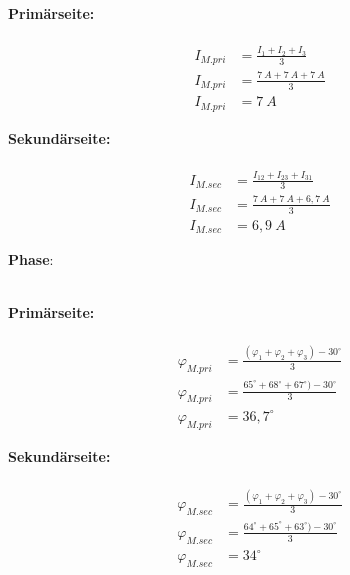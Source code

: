 \begin{enumerate}[label=\alph*)]
\begin{tcolorbox}[colback=gray!30,
			      colframe=black,
			      width=0.9\textwidth,
		      ]
{			      \begin{minipage}{0.5\textwidth}
				      \textbf{Primärseite:}\\ \ \\
				      \begin{align*}
					      I_{M.pri} & = \frac{I_{1} + I_{2} + I_{3}}{3} \\
					      I_{M.pri} & = \frac{7\ A + 7\ A + 7\ A}{3}    \\
					      I_{M.pri} & = 7\ A
				      \end{align*}
			      \end{minipage}\hfill
			      \begin{minipage}{0.5\textwidth}
				      \textbf{Sekundärseite:}\\ \ \\
				      \begin{align*}
					      I_{M.sec} & = \frac{I_{12} + I_{23} + I_{31}}{3} \\
					      I_{M.sec} & = \frac{7\ A + 7\ A + 6,7\ A}{3}     \\
					      I_{M.sec} & = 6,9\ A
				      \end{align*}
			      \end{minipage}
		      }
	      \end{tcolorbox}


	      \textbf{Phase}:\\\ \\
	      \begin{tcolorbox}[colback=gray!30,
			      colframe=black,
			      width=0.9\textwidth,
		      ]
		      \parbox{\textwidth}{

			      \begin{minipage}{0.5\textwidth}
				      \textbf{Primärseite:}\\ \ \\
				      \begin{align*}
					      \varphi_{M.pri} & = \frac{(\varphi_{1} + \varphi_{2} + \varphi_{3})-30^\circ}{3} \\
					      \varphi_{M.pri} & = \frac{65^\circ+68^\circ+67^\circ)-30^\circ}{3}               \\
					      \varphi_{M.pri} & = 36,7^\circ
				      \end{align*}
			      \end{minipage}\hfill
			      \begin{minipage}{0.5\textwidth}
				      \textbf{Sekundärseite:}\\ \ \\
				      \begin{align*}
					      \varphi_{M.sec} & = \frac{(\varphi_{1} + \varphi_{2} + \varphi_{3})-30^\circ}{3} \\
					      \varphi_{M.sec} & = \frac{64^\circ+65^\circ+63^\circ)-30^\circ}{3}               \\
					      \varphi_{M.sec} & = 34^\circ
				      \end{align*}
			      \end{minipage}
		      }
	      \end{tcolorbox}



\end{enumerate}
